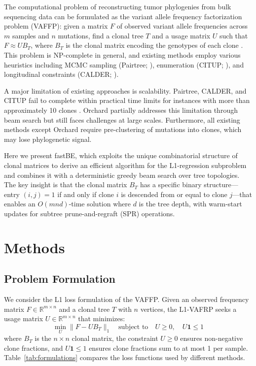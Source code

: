 \documentclass[11pt]{article}
\begin{document}
The computational problem of reconstructing tumor phylogenies from bulk sequencing data can be formulated as the variant allele frequency factorization problem (VAFFP): given a matrix $F$ of observed variant allele frequencies across $m$ samples and $n$ mutations, find a clonal tree $T$ and a usage matrix $U$ such that $F \approx UB_T$, where $B_T$ is the clonal matrix encoding the genotypes of each clone \citep{elshiekh2015automated}. This problem is NP-complete in general, and existing methods employ various heuristics including MCMC sampling (Pairtree; \citealt{wintersinger2022reconstructing}), enumeration (CITUP; \citealt{malikic2015citup}), and longitudinal constraints (CALDER; \citealt{myers2022calder}).

A major limitation of existing approaches is scalability. Pairtree, CALDER, and CITUP fail to complete within practical time limits for instances with more than approximately 10 clones \citep{wintersinger2022reconstructing}. Orchard \citep{wintersinger2022orchard} partially addresses this limitation through beam search but still faces challenges at large scales. Furthermore, all existing methods except Orchard require pre-clustering of mutations into clones, which may lose phylogenetic signal.

Here we present fastBE, which exploits the unique combinatorial structure of clonal matrices to derive an efficient algorithm for the L1-regression subproblem and combines it with a deterministic greedy beam search over tree topologies. The key insight is that the clonal matrix $B_T$ has a specific binary structure---entry $(i,j) = 1$ if and only if clone $i$ is descended from or equal to clone $j$---that enables an $O(mnd)$-time solution where $d$ is the tree depth, with warm-start updates for subtree prune-and-regraft (SPR) operations.

\section{Methods}

\subsection{Problem Formulation}

We consider the L1 loss formulation of the VAFFP. Given an observed frequency matrix $F \in \mathbb{R}^{m \times n}$ and a clonal tree $T$ with $n$ vertices, the L1-VAFRP seeks a usage matrix $U \in \mathbb{R}^{m \times n}$ that minimizes:
\begin{equation}
\min_{U} \|F - UB_T\|_1 \quad \text{subject to} \quad U \geq 0, \quad U\mathbf{1} \leq 1
\end{equation}
where $B_T$ is the $n \times n$ clonal matrix, the constraint $U \geq 0$ ensures non-negative clone fractions, and $U\mathbf{1} \leq 1$ ensures clone fractions sum to at most 1 per sample. Table~\ref{tab:formulations} compares the loss functions used by different methods.
\end{document}
